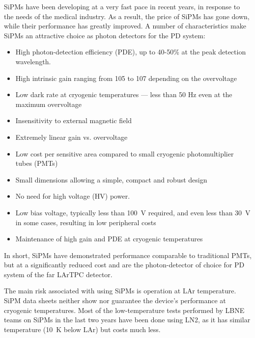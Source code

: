 SiPMs have been developing at a very fast pace in recent years, in
response to the needs of the medical industry. As a result, the price of
SiPMs has gone down, while their performance has greatly
improved. A number of characteristics make SiPMs an
attractive choice as photon detectors for the PD system:

\begin{itemize}

\item{High photon-detection efficiency (PDE), up to 40-50\% at the
  peak detection wavelength. }

\item{High intrinsic gain ranging from 105 to 107 depending on the
  overvoltage}
\item{Low dark rate at cryogenic temperatures --- less than 50 Hz even
  at the maximum overvoltage}
\item{Insensitivity to external magnetic field}
\item{Extremely linear gain vs. overvoltage}
\item{Low cost per sensitive area compared to small cryogenic
  photomultiplier tubes (PMTs)}
\item{Small dimensions allowing a simple, compact and robust design}
\item{No need for high voltage (HV) power.}
\item{Low bias voltage, typically less than 100~V required, and even
  less than 30~V in some cases, resulting in low peripheral costs}
\item{Maintenance of high gain and PDE at cryogenic temperatures}

\end{itemize}

In short, SiPMs have demonstrated performance comparable to
traditional PMTs, but at a significantly reduced cost and %
are the photon-detector of choice for PD system of the far
LArTPC detector.

The main risk associated with using SiPMs is  %
operation at LAr temperature. %
SiPM
data sheets neither show nor guarantee the device's performance at cryogenic
temperatures. %
Most of the low-temperature tests performed by LBNE teams on SiPMs in the last two years have been
done using LN2, as it has similar temperature (10~K below LAr) but
costs much less.

